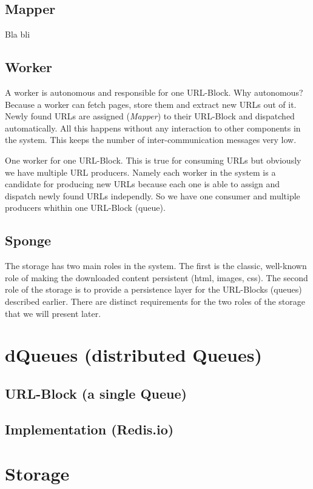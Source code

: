 \subsection{Mapper}
Bla bli

\subsection{Worker}
A worker is autonomous and responsible for one URL-Block. Why autonomous? Because a worker can fetch pages, store them and extract new URLs out of it. Newly found URLs are assigned (\emph{Mapper}) to their URL-Block and dispatched automatically. All this happens without any interaction to other components in the system. This keeps the number of inter-communication messages very low.

One worker for one URL-Block. This is true for consuming URLs but obviously we have multiple URL producers. Namely each worker in the system is a candidate for producing new URLs because each one is able to assign and dispatch newly found URLs independly. So we have one consumer and multiple producers whithin one URL-Block (queue).

\subsection{Sponge}
The storage has two main roles in the system. The first is the classic, well-known role of making the downloaded content persistent (html, images, css). The second role of the storage is to provide a persistence layer for the URL-Blocks (queues) described earlier.
There are distinct requirements for the two roles of the storage that we will present later.

\section{dQueues (distributed Queues)}
\subsection{URL-Block (a single Queue)}
\subsection{Implementation (Redis.io)}

\section{Storage}
